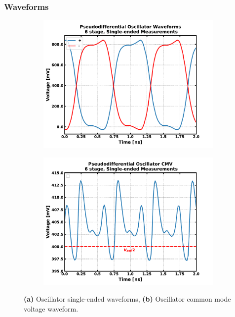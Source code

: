 	\FloatBarrier
	\subsubsection{Waveforms}
			\begin{figure}[htb!]
			    \centering
			    \begin{subfigure}{0.5\textwidth}
			        \centering
			        \includegraphics[width=1\textwidth, angle=0]{./figs/results/osc_se_waves}
			        \caption{ }
			        \label{fig:osc_se_waves}
			    \end{subfigure}%
			    \begin{subfigure}{0.5\textwidth}
			        \centering
			        \includegraphics[width=1\textwidth, angle=0]{./figs/results/osc_cmv}
			        \caption{ }
			        \label{fig:osc_cmv}
			    \end{subfigure}
			    \label{fig:osc_waves}
			    \caption{\textbf{(a)} Oscillator single-ended waveforms, \textbf{(b)} Oscillator common mode voltage waveform.}
			\end{figure} 
	\FloatBarrier

